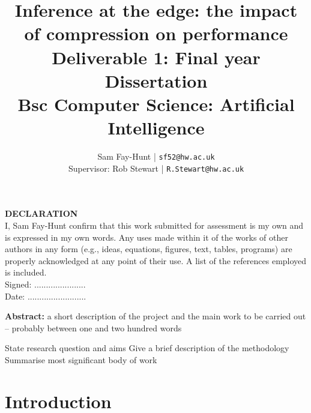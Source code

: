\documentclass[11pt]{article}
\begin{document}
\title{%
	\bf Inference at the edge: the impact of compression on performance\\ 
	\large Deliverable 1: Final year Dissertation \\
	Bsc Computer Science: Artificial Intelligence}

\author{
	Sam Fay-Hunt | \texttt{sf52@hw.ac.uk}\\
	Supervisor: Rob Stewart | \texttt{R.Stewart@hw.ac.uk}
}

\maketitle
\thispagestyle{empty}
\pagebreak

\textbf{DECLARATION}\\
I, Sam Fay-Hunt confirm that this work submitted for assessment is my own and is expressed in
my own words. Any uses made within it of the works of other authors in any form (e.g., ideas,
equations, figures, text, tables, programs) are properly acknowledged at any point of their
use. A list of the references employed is included.\\
Signed: ......................\\
Date: .........................
\thispagestyle{empty}
\pagebreak

\textbf{Abstract:} a short description of the project and the main work to be carried out – probably
between one and two hundred words

State research question and aims
Give a brief description of the methodology
Summarise most significant body of work


\thispagestyle{empty}
\pagebreak

\tableofcontents
\thispagestyle{empty}
\pagebreak

\printnoidxglossary[type=acronym, nonumberlist]
\thispagestyle{empty}

\newpage
\setcounter{page}{1}

\section{Introduction}


\pagebreak
\end{document}

